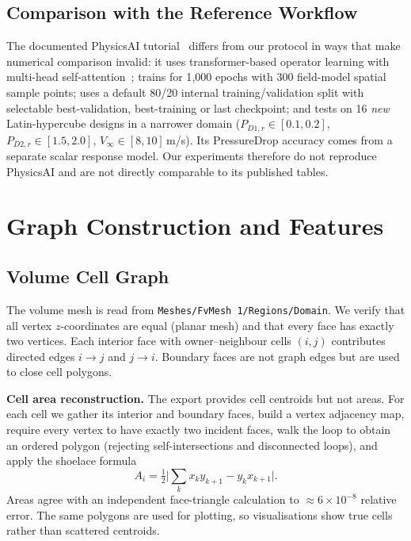 \documentclass[journal]{IEEEtran}
\newcommand{\pdone}{P_{D1,r}}
\newcommand{\pdtwo}{P_{D2,r}}
\newcommand{\Vin}{V_{\infty}}
\begin{document}
\subsection{Comparison with the Reference Workflow}
\label{sec:siemens}
The documented PhysicsAI tutorial~\cite{siemens_train,siemens_validate,siemens_ref,siemens_theory}
differs from our protocol in ways that make numerical comparison invalid:
it uses transformer-based operator learning with multi-head
self-attention~\cite{siemens_theory}; trains for 1{,}000 epochs with 300
field-model spatial sample points; uses a default 80/20 internal
training/validation split with selectable best-validation, best-training or
last checkpoint; and tests on 16 \emph{new} Latin-hypercube designs in a
narrower domain ($\pdone\in[0.1,0.2]$, $\pdtwo\in[1.5,2.0]$,
$\Vin\in[8,10]$\,m/s). Its PressureDrop accuracy comes from a separate scalar
response model. Our experiments therefore do not reproduce PhysicsAI and are
not directly comparable to its published tables.

\section{Graph Construction and Features}
\label{sec:graph}
\subsection{Volume Cell Graph}
The volume mesh is read from \texttt{Meshes/FvMesh~1/Regions/Domain}. We verify
that all vertex $z$-coordinates are equal (planar mesh) and that every face has
exactly two vertices. Each interior face with owner--neighbour cells $(i,j)$
contributes directed edges $i\!\to\!j$ and $j\!\to\!i$. Boundary faces are not
graph edges but are used to close cell polygons.

\textbf{Cell area reconstruction.} The export provides cell centroids but not
areas. For each cell we gather its interior and boundary faces, build a vertex
adjacency map, require every vertex to have exactly two incident faces, walk the
loop to obtain an ordered polygon (rejecting self-intersections and disconnected
loops), and apply the shoelace formula
\begin{equation}
A_i=\tfrac12\Big|\textstyle\sum_k x_k y_{k+1}-y_k x_{k+1}\Big|.
\end{equation}
Areas agree with an independent face-triangle calculation to
$\approx6\times10^{-8}$ relative error. The same polygons are used for plotting,
so visualisations show true cells rather than scattered centroids.
\end{document}
